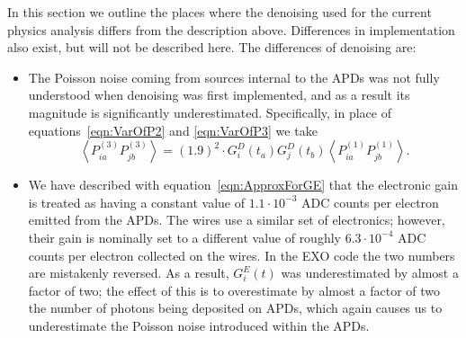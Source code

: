 In this section we outline the places where the denoising used for the current physics analysis differs from the description above.  Differences in implementation also exist, but will not be described here.  The differences of denoising are:
\begin{itemize}
\item The Poisson noise coming from sources internal to the APDs was not fully understood when denoising was first implemented, and as a result its magnitude is significantly underestimated.  Specifically, in place of equations~\ref{eqn:VarOfP2} and \ref{eqn:VarOfP3} we take
\begin{equation}
\left< P^{(3)}_{ia} P^{(3)}_{jb} \right> = (1.9)^2 \cdot G^D_i(t_a)G^D_j(t_b) \left< P^{(1)}_{ia} P^{(1)}_{jb} \right>.
\end{equation}
\item We have described with equation~\ref{eqn:ApproxForGE} that the electronic gain is treated as having a constant value of $1.1 \cdot 10^{-3}$ ADC counts per electron emitted from the APDs.  The wires use a similar set of electronics; however, their gain is nominally set to a different value of roughly $6.3 \cdot 10^{-4}$ ADC counts per electron collected on the wires. In the EXO code the two numbers are mistakenly reversed.  As a result, $G^E_i(t)$ was underestimated by almost a factor of two; the effect of this is to overestimate by almost a factor of two the number of photons being deposited on APDs, which again causes us to underestimate the Poisson noise introduced within the APDs.
\end{itemize}

